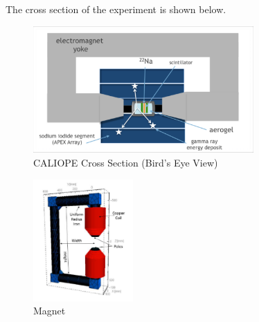  The cross section of the experiment is shown below.
 \begin{figure}[H]
 \includegraphics[width=0.75\textwidth,center]{CALIOPE_CrossSec.pdf}
 \caption{CALIOPE Cross Section (Bird's Eye View)}
 \end{figure}


\begin{figure}
 \vspace{-10pt}
  \begin{center}
    \includegraphics[width=0.34\textwidth]{Magnet.pdf}
  \end{center}
 \vspace{-10pt}
  \caption{Magnet}
\end{figure}

